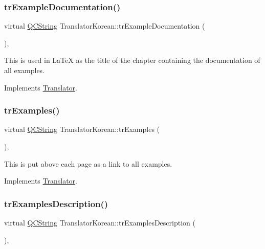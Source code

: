 \subsubsection{\texorpdfstring{trExampleDocumentation()}{trExampleDocumentation()}}
{\footnotesize\ttfamily virtual \mbox{\hyperlink{class_q_c_string}{Q\+C\+String}} Translator\+Korean\+::tr\+Example\+Documentation (\begin{DoxyParamCaption}{ }\end{DoxyParamCaption})\hspace{0.3cm}{\ttfamily [inline]}, {\ttfamily [virtual]}}

This is used in La\+TeX as the title of the chapter containing the documentation of all examples. 

Implements \mbox{\hyperlink{class_translator}{Translator}}.

\mbox{\label{class_translator_korean_a4532ba0db931e3bde21d05ca0157bb40}} 
\subsubsection{\texorpdfstring{trExamples()}{trExamples()}}
{\footnotesize\ttfamily virtual \mbox{\hyperlink{class_q_c_string}{Q\+C\+String}} Translator\+Korean\+::tr\+Examples (\begin{DoxyParamCaption}{ }\end{DoxyParamCaption})\hspace{0.3cm}{\ttfamily [inline]}, {\ttfamily [virtual]}}

This is put above each page as a link to all examples. 

Implements \mbox{\hyperlink{class_translator}{Translator}}.

\mbox{\label{class_translator_korean_ad10a70724298842340ece3453ee2618f}} 
\subsubsection{\texorpdfstring{trExamplesDescription()}{trExamplesDescription()}}
{\footnotesize\ttfamily virtual \mbox{\hyperlink{class_q_c_string}{Q\+C\+String}} Translator\+Korean\+::tr\+Examples\+Description (\begin{DoxyParamCaption}{ }\end{DoxyParamCaption})\hspace{0.3cm}{\ttfamily [inline]}, {\ttfamily [virtual]}}

